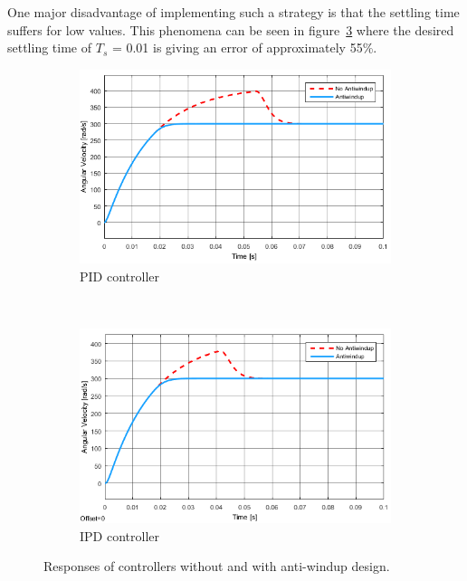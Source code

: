 One major disadvantage of implementing such a strategy is that the settling time suffers for low values. This phenomena can be seen in figure~\ref{fig:antiwindupresponses} where the desired settling time of $T_s$ = 0.01 is giving an error of approximately 55\%. 
\begin{figure}
	\centering
	\begin{subfigure}[b]{0.45\textwidth}
		\includegraphics[width=\textwidth]{graphics/pidwindupresponse}
		\caption{PID controller}
		\label{fig:pidwindupresponse}
	\end{subfigure}
	~ %
	\begin{subfigure}[b]{0.45\textwidth}
		\includegraphics[width=\textwidth]{graphics/ipdwindupresponse}
		\caption{IPD controller}
		\label{fig:ipdwindupresponse}
	\end{subfigure}
	\caption{Responses of controllers without and with anti-windup design.}\label{fig:antiwindupresponses}
\end{figure}


